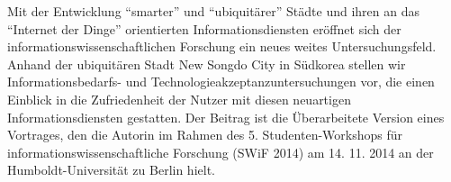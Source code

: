 Mit der Entwicklung ``smarter'' und ``ubiquitärer'' Städte und ihren an
das ``Internet der Dinge'' orientierten Informationsdiensten eröffnet
sich der informationswissenschaftlichen Forschung ein neues weites
Untersuchungsfeld. Anhand der ubiquitären Stadt New Songdo City in
Südkorea stellen wir Informationsbedarfs- und
Technologieakzeptanzuntersuchungen vor, die einen Einblick in die
Zufriedenheit der Nutzer mit diesen neuartigen Informationsdiensten
gestatten. Der Beitrag ist die Überarbeitete Version eines Vortrages,
den die Autorin im Rahmen des 5. Studenten-Workshops für
informationswissenschaftliche Forschung (SWiF 2014) am 14. 11. 2014 an
der Humboldt-Universität zu Berlin hielt.
